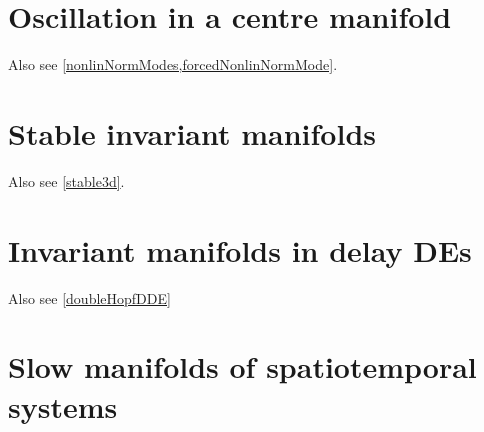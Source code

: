 \documentclass[11pt,a4paper]{refart}
\begin{document}
\section{Oscillation in a centre manifold}

Also see \cref{nonlinNormModes,forcedNonlinNormMode}.








\section{Stable invariant manifolds}

Also see \cref{stable3d}.




\section{Invariant manifolds in delay DEs}

Also see \cref{doubleHopfDDE}





\section{Slow manifolds of spatiotemporal systems}








\end{document}
